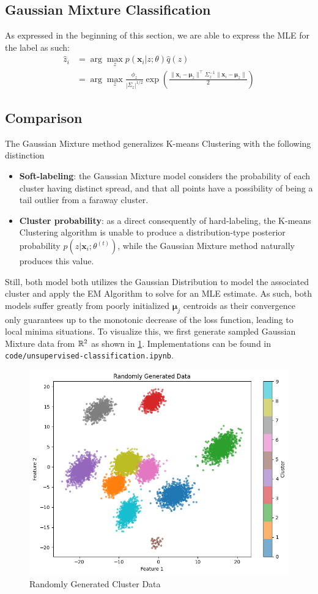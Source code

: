 \subsection{Gaussian Mixture Classification}
As expressed in the beginning of this section, we are able to express the MLE for the label as such:
\begin{align*}
    \hat{z}_i
    &= \arg\max_z p(\mathbf{x}_i|z;\theta)\hat{q}(z) \\
    &= \arg\max_z \frac{\phi_z}{|\Sigma_z|^{1/2}} \exp\left(\frac{\|\mathbf{x}_i-\boldsymbol{\mu}_z\|^\top\Sigma_z^{-1}\|\mathbf{x}_i-\boldsymbol{\mu}_z\|}{2}\right)
\end{align*}
\subsection{Comparison}
The Gaussian Mixture method generalizes K-means Clustering with the following distinction
\begin{itemize}
    \item \textbf{Soft-labeling}: the Gaussian Mixture model considers the probability of each cluster having distinct spread, and that all points have a possibility of being a tail outlier from a faraway cluster.
    \item \textbf{Cluster probability}: as a direct consequently of hard-labeling, the K-means Clustering algorithm is unable to produce a distribution-type posterior probability $p(z|\mathbf{x}_i;\theta^{(t)})$, while the Gaussian Mixture method naturally produces this value.
\end{itemize}
Still, both model both utilizes the Gaussian Distribution to model the associated cluster and apply the EM Algorithm to solve for an MLE estimate. As such, both models suffer greatly from poorly initialized $\boldsymbol{\mu}_j$ centroids as their convergence only guarantees up to the monotonic decrease of the loss function, leading to local minima situations. To visualize this, we first generate sampled Gaussian Mixture data from $\mathbb{R}^2$ as shown in \ref{fig:clusters}. Implementations can be found in \texttt{code/unsupervised-classification.ipynb}.
\begin{figure}[h]
    \centering
    \includegraphics[width=0.6\linewidth]{figures/cluster-gt.png}
    \caption{Randomly Generated Cluster Data}
    \label{fig:clusters}
\end{figure}

